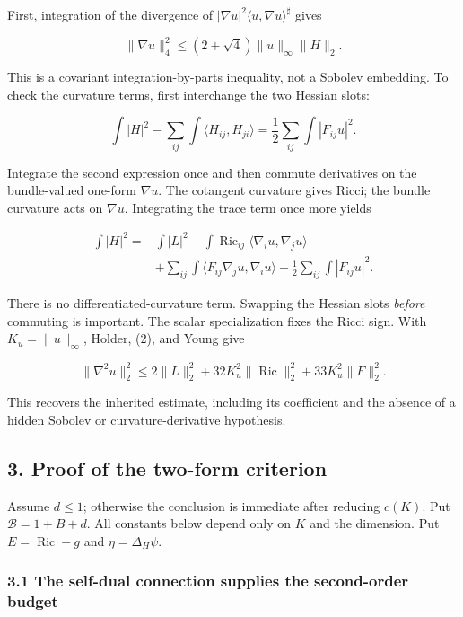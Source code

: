 \documentclass[
  10pt,
]{article}
\begin{document}
First, integration of the divergence of
\(|\nabla u|^2\langle u,\nabla u\rangle^\sharp\) gives

\[
 \|\nabla u\|_4^2\le(2+\sqrt4)\|u\|_\infty\|H\|_2.
                                                               \tag{2}
\]

This is a covariant integration-by-parts inequality, not a Sobolev
embedding. To check the curvature terms, first interchange the two
Hessian slots:

\[
 \int|H|^2-\sum_{ij}\int\langle H_{ij},H_{ji}\rangle
 =\frac12\sum_{ij}\int|F_{ij}u|^2.
\]

Integrate the second expression once and then commute derivatives on the
bundle-valued one-form \(\nabla u\). The cotangent curvature gives
Ricci; the bundle curvature acts on \(\nabla u\). Integrating the trace
term once more yields

\[
\begin{aligned}
 \int|H|^2={}&\int|L|^2
 -\int\operatorname{Ric}_{ij}\langle\nabla_i u,\nabla_j u\rangle\\
 &+\sum_{ij}\int\langle F_{ij}\nabla_j u,\nabla_i u\rangle
 +\frac12\sum_{ij}\int|F_{ij}u|^2.                         
\end{aligned}\tag{3}
\]

There is no differentiated-curvature term. Swapping the Hessian slots
\emph{before} commuting is important. The scalar specialization fixes
the Ricci sign. With \(K_u=\|u\|_\infty\), Holder, (2), and Young give

\[
 \|\nabla^2u\|_2^2\le
 2\|L\|_2^2+32K_u^2\|\operatorname{Ric}\|_2^2
                         +33K_u^2\|F\|_2^2.              \tag{4}
\]

This recovers the inherited estimate, including its coefficient and the
absence of a hidden Sobolev or curvature-derivative hypothesis.

\hypertarget{proof-of-the-two-form-criterion}{%
\subsection{3. Proof of the two-form
criterion}\label{proof-of-the-two-form-criterion}}

Assume \(d\le1\); otherwise the conclusion is immediate after reducing
\(c(K)\). Put \(\mathcal B=1+B+d\). All constants below depend only on
\(K\) and the dimension. Put \(E=\operatorname{Ric}+g\) and
\(\eta=\Delta_H\psi\).

\hypertarget{the-self-dual-connection-supplies-the-second-order-budget}{%
\subsubsection{3.1 The self-dual connection supplies the second-order
budget}\label{the-self-dual-connection-supplies-the-second-order-budget}}
\end{document}
